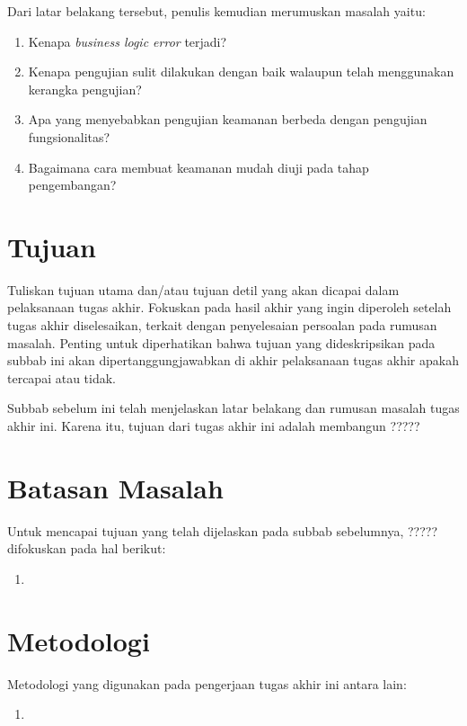 Dari latar belakang tersebut, penulis kemudian merumuskan masalah yaitu:

\begin{enumerate}
    \item Kenapa \textit{business logic error} terjadi?
    \item Kenapa pengujian sulit dilakukan dengan baik walaupun telah menggunakan kerangka pengujian?
    \item Apa yang menyebabkan pengujian keamanan berbeda dengan pengujian fungsionalitas?
    \item Bagaimana cara membuat keamanan mudah diuji pada tahap pengembangan?%
\end{enumerate}

\section{Tujuan}

Tuliskan tujuan utama dan/atau tujuan detil yang akan dicapai dalam pelaksanaan tugas akhir. Fokuskan pada hasil akhir yang ingin diperoleh setelah tugas akhir diselesaikan, terkait dengan penyelesaian persoalan pada rumusan masalah. Penting untuk diperhatikan bahwa tujuan yang dideskripsikan pada subbab ini akan dipertanggungjawabkan di akhir pelaksanaan tugas akhir apakah tercapai atau tidak.

Subbab sebelum ini telah menjelaskan latar belakang dan rumusan masalah tugas akhir ini.
Karena itu, tujuan dari tugas akhir ini adalah membangun ????? 

\section{Batasan Masalah}

Untuk mencapai tujuan yang telah dijelaskan pada subbab sebelumnya, ????? difokuskan pada hal berikut:

\begin{enumerate}
    \item 
\end{enumerate}

\section{Metodologi}

Metodologi yang digunakan pada pengerjaan tugas akhir ini antara lain:

\begin{enumerate}
    \item 
\end{enumerate}
